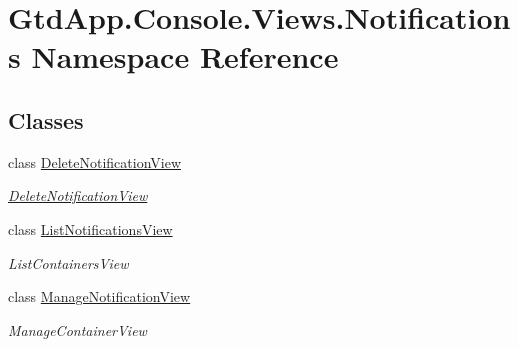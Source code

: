 \hypertarget{namespace_gtd_app_1_1_console_1_1_views_1_1_notifications}{}\section{Gtd\+App.\+Console.\+Views.\+Notifications Namespace Reference}
\label{namespace_gtd_app_1_1_console_1_1_views_1_1_notifications}
\subsection*{Classes}
\begin{DoxyCompactItemize}
\item 
class \mbox{\hyperlink{class_gtd_app_1_1_console_1_1_views_1_1_notifications_1_1_delete_notification_view}{Delete\+Notification\+View}}
\begin{DoxyCompactList}\small\item\em \mbox{\hyperlink{class_gtd_app_1_1_console_1_1_views_1_1_notifications_1_1_delete_notification_view}{Delete\+Notification\+View}} \end{DoxyCompactList}\item 
class \mbox{\hyperlink{class_gtd_app_1_1_console_1_1_views_1_1_notifications_1_1_list_notifications_view}{List\+Notifications\+View}}
\begin{DoxyCompactList}\small\item\em List\+Containers\+View \end{DoxyCompactList}\item 
class \mbox{\hyperlink{class_gtd_app_1_1_console_1_1_views_1_1_notifications_1_1_manage_notification_view}{Manage\+Notification\+View}}
\begin{DoxyCompactList}\small\item\em Manage\+Container\+View \end{DoxyCompactList}\end{DoxyCompactItemize}
